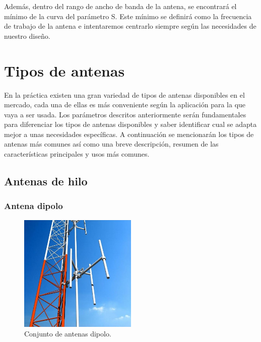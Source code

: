 \par Además, dentro del rango de ancho de banda de la antena, se encontrará el mínimo de la curva del parámetro S. Este mínimo se definirá como la frecuencia de trabajo de la antena e intentaremos centrarlo siempre según las necesidades de nuestro diseño.


\section{Tipos de antenas}

\par En la práctica existen una gran variedad de tipos de antenas disponibles en el mercado, cada una de ellas es más conveniente según la aplicación para la que vaya a ser usada. Los parámetros descritos anteriormente serán fundamentales para diferenciar los tipos de antenas disponibles y saber identificar cual se adapta mejor a unas necesidades específicas. A continuación se mencionarán los tipos de antenas más comunes así como una breve descripción, resumen de las características principales y usos más comunes. \cite{Frenzel2013, WNI2012, Cardama2002}

\subsection{Antenas de hilo}
\subsubsection{Antena dipolo}

\begin{figure}
    \centering
        \includegraphics[width=0.5\textwidth]{archivos/dipolo/dipoloo}
        \caption{Conjunto de antenas dipolo. \cite{Ideal-Antenas2008}}
        \label{fig:conjuntodipolo}
\end{figure}

